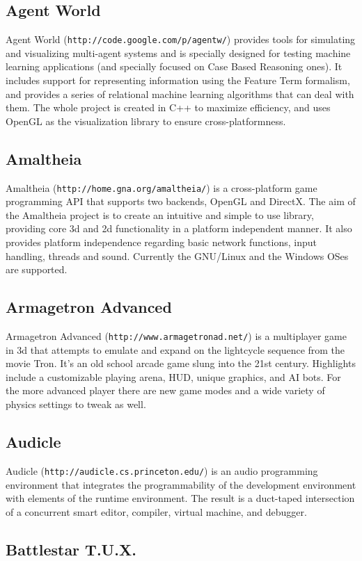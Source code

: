 \subsection{Agent World}\label{ftgl-projects_agentw}
Agent World ({\tt http://code.google.com/p/agentw/}) provides tools for simulating and visualizing multi-\/agent systems and is specially designed for testing machine learning applications (and specially focused on Case Based Reasoning ones). It includes support for representing information using the Feature Term formalism, and provides a series of relational machine learning algorithms that can deal with them. The whole project is created in C++ to maximize efficiency, and uses OpenGL as the visualization library to ensure cross-\/platformness.\subsection{Amaltheia}\label{ftgl-projects_amaltheia}
Amaltheia ({\tt http://home.gna.org/amaltheia/}) is a cross-\/platform game programming API that supports two backends, OpenGL and DirectX. The aim of the Amaltheia project is to create an intuitive and simple to use library, providing core 3d and 2d functionality in a platform independent manner. It also provides platform independence regarding basic network functions, input handling, threads and sound. Currently the GNU/Linux and the Windows OSes are supported.\subsection{Armagetron Advanced}\label{ftgl-projects_armagetronad}
Armagetron Advanced ({\tt http://www.armagetronad.net/}) is a multiplayer game in 3d that attempts to emulate and expand on the lightcycle sequence from the movie Tron. It's an old school arcade game slung into the 21st century. Highlights include a customizable playing arena, HUD, unique graphics, and AI bots. For the more advanced player there are new game modes and a wide variety of physics settings to tweak as well.\subsection{Audicle}\label{ftgl-projects_audicle}
Audicle ({\tt http://audicle.cs.princeton.edu/}) is an audio programming environment that integrates the programmability of the development environment with elements of the runtime environment. The result is a duct-\/taped intersection of a concurrent smart editor, compiler, virtual machine, and debugger.\subsection{Battlestar T.U.X.}\label{ftgl-projects_battlestartux}
